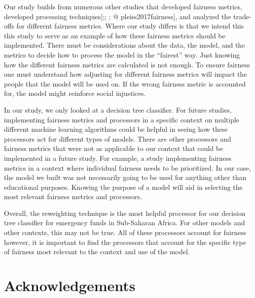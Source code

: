 \documentclass[water,article,submit,moreauthors,pdftex]{mdpi}
\begin{document}
Our study builds from numerous other studies that developed fairness
metrics\citep{speicher2018unified, wachter2021fairness}, developed
processing
techniques{[}\citet{agarwal2018reductions};\citet{kamiran2012data};
\citet{agarwal2019fair}; @ pleiss2017fairness{]}, and analyzed the
trade-offs for different fairness metrics\citep{speicher2018unified}.
Where our study differs is that we intend this this study to serve as an
example of how these fairness metrics should be implemented. There must
be considerations about the data, the model, and the metrics to decide
how to process the model in the ``fairest'' way. Just knowing how the
different fairness metrics are calculated is not enough. To ensure
fairness one must understand how adjusting for different fairness
metrics will impact the people that the model will be used on. If the
wrong fairness metric is accounted for, the model might reinforce social
injustices.

In our study, we only looked at a decision tree classifier. For future
studies, implementing fairness metrics and processors in a specific
context on multiple different machine learning algorithms could be
helpful in seeing how these processors act for different types of
models. There are other processors and fairness metrics that were not as
applicable to our context that could be implemented in a future study.
For example, a study implementing fairness metrics in a context where
individual fairness needs to be prioritized. In our case, the model we
built was not necessarily going to be used for anything other than
educational purposes. Knowing the purpose of a model will aid in
selecting the most relevant fairness metrics and processors.

Overall, the reweighting technique is the most helpful processor for our
decision tree classifier for emergency funds in Sub-Saharan Africa. For
other models and other contexts, this may not be true. All of these
processors account for fairness however, it is important to find the
processors that account for the specific type of fairness most relevant
to the context and use of the model.

\hypertarget{acknowledgements}{%
\section{Acknowledgements}\label{acknowledgements}}
\end{document}
